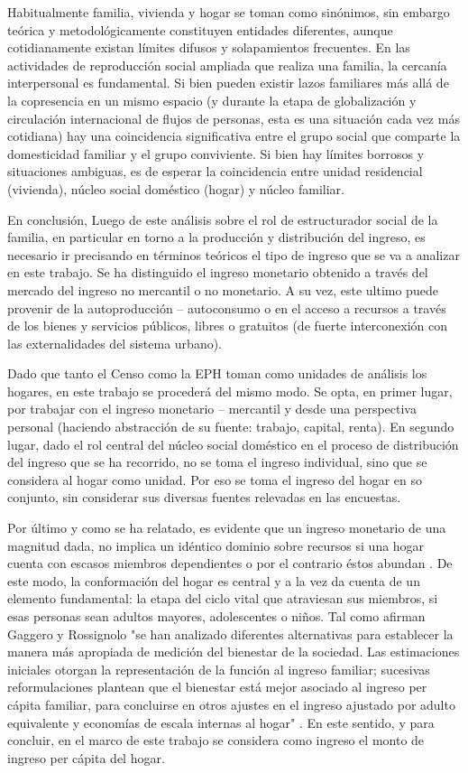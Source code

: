 Habitualmente familia, vivienda y hogar se toman como sinónimos, sin embargo teórica y metodológicamente constituyen entidades diferentes, aunque cotidianamente existan límites difusos y solapamientos frecuentes. En las actividades de reproducción social ampliada que realiza una familia, la cercanía interpersonal es fundamental. Si bien pueden existir lazos familiares más allá de la copresencia en un mismo espacio (y durante la etapa de globalización y circulación internacional de flujos de personas, esta es una situación cada vez más cotidiana) hay una coincidencia significativa entre el grupo social que comparte la domesticidad familiar y el grupo conviviente. Si bien hay límites borrosos y situaciones ambiguas, es de esperar la coincidencia entre unidad residencial (vivienda), núcleo social doméstico (hogar) y núcleo familiar. 
	
En conclusión, Luego de este análisis sobre el rol de estructurador social de la familia, en particular en torno a la producción y distribución del ingreso, es necesario ir precisando en términos teóricos el tipo de ingreso que se va a analizar en este trabajo. Se ha distinguido el ingreso monetario obtenido a través del mercado del ingreso no mercantil o no monetario. A su vez, este ultimo puede provenir de la autoproducción – autoconsumo o en el acceso a recursos a través de los bienes y servicios públicos, libres o gratuitos (de fuerte interconexión con las externalidades del sistema urbano).
	
Dado que tanto el Censo como la EPH toman como unidades de análisis los hogares, en este trabajo se procederá del mismo modo. Se opta, en primer lugar, por trabajar con el ingreso monetario – mercantil y desde una perspectiva personal (haciendo abstracción de su fuente: trabajo, capital, renta). En segundo lugar, dado el rol central del núcleo social doméstico en el proceso de distribución del ingreso que se ha recorrido, no se toma el ingreso individual, sino que se considera al hogar como unidad. Por eso se toma el ingreso del hogar en so conjunto, sin considerar sus diversas fuentes relevadas en las encuestas.
	
Por último y como se ha relatado, es evidente que un ingreso monetario de una magnitud dada, no implica un idéntico dominio sobre recursos si una hogar cuenta con escasos miembros dependientes o por el contrario éstos abundan \cite{buhmann}. De este modo, la conformación del hogar es central y a la vez da cuenta de un elemento fundamental: la etapa del ciclo vital que atraviesan sus miembros, si esas personas sean adultos mayores, adolescentes o niños. Tal como afirman Gaggero y Rossignolo "se han analizado diferentes alternativas para establecer la manera más apropiada de medición del bienestar de la sociedad. Las estimaciones iniciales otorgan la representación de la función al ingreso familiar; sucesivas reformulaciones plantean que el bienestar está mejor asociado al ingreso per cápita familiar, para concluirse en otros ajustes en el ingreso ajustado por adulto equivalente y economías de escala internas al hogar" \cite[p.~12]{gaggero} . En este sentido, y para concluir, en el marco de este trabajo se considera como ingreso el monto de ingreso per cápita del hogar.
	
